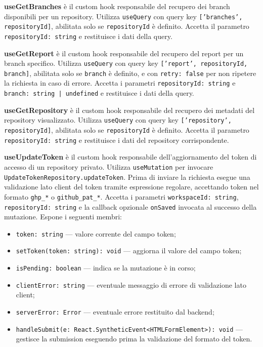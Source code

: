 \documentclass[a4paper, 11pt]{article}
\begin{document}
\textbf{useGetBranches} è il custom hook responsabile del recupero dei branch disponibili per
un repository. Utilizza \texttt{useQuery} con query key \texttt{['branches', repositoryId]},
abilitata solo se \texttt{repositoryId} è definito. Accetta il parametro
\texttt{repositoryId: string} e restituisce i dati della query.

\textbf{useGetReport} è il custom hook responsabile del recupero del report per un branch
specifico. Utilizza \texttt{useQuery} con query key \texttt{['report', repositoryId, branch]},
abilitata solo se \texttt{branch} è definito, e con \texttt{retry: false} per non ripetere
la richiesta in caso di errore. Accetta i parametri \texttt{repositoryId: string} e
\texttt{branch: string | undefined} e restituisce i dati della query.

\textbf{useGetRepository} è il custom hook responsabile del recupero dei metadati del
repository visualizzato. Utilizza \texttt{useQuery} con query key
\texttt{['repository', repositoryId]}, abilitata solo se \texttt{repositoryId} è definito.
Accetta il parametro \texttt{repositoryId: string} e restituisce i dati del repository
corrispondente.

\textbf{useUpdateToken} è il custom hook responsabile dell'aggiornamento del token di accesso
di un repository privato. Utilizza \texttt{useMutation} per invocare
\texttt{UpdateTokenRepository.updateToken}. Prima di inviare la richiesta esegue una
validazione lato client del token tramite espressione regolare, accettando token nel formato
\texttt{ghp\_*} o \texttt{github\_pat\_*}. Accetta i parametri \texttt{workspaceId: string},
\texttt{repositoryId: string} e la callback opzionale \texttt{onSaved} invocata al successo
della mutazione. Espone i seguenti membri:
\begin{itemize}
  \item \texttt{token: string} — valore corrente del campo token;
  \item \texttt{setToken(token: string): void} — aggiorna il valore del campo token;
  \item \texttt{isPending: boolean} — indica se la mutazione è in corso;
  \item \texttt{clientError: string} — eventuale messaggio di errore di validazione lato client;
  \item \texttt{serverError: Error} — eventuale errore restituito dal backend;
  \item \texttt{handleSubmit(e: React.SyntheticEvent<HTMLFormElement>): void} — gestisce la
        submission eseguendo prima la validazione del formato del token.
\end{itemize}
\end{document}
